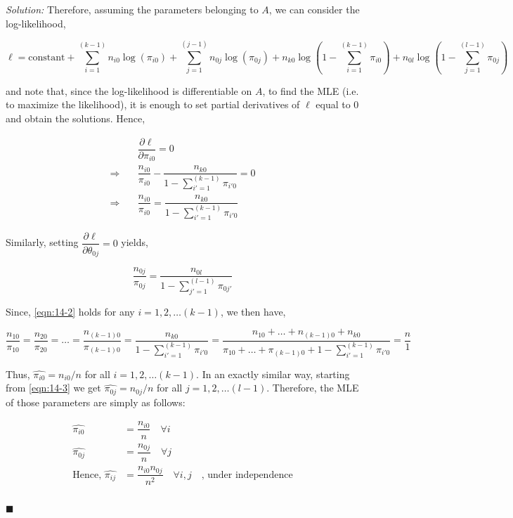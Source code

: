\documentclass[12pt]{article}
\theoremstyle{definition}
\newenvironment{answer}{\textit{Solution: }\quad }{ \hfill $\blacksquare$}
\numberwithin{equation}{section}
\begin{document}
\begin{answer}
    Therefore, assuming the parameters belonging to $A$, we can consider the log-likelihood,
    
    $$
    \ell = \text{constant} + \sum_{i=1}^{(k-1)} n_{i0} \log(\pi_{i0}) + \sum_{j=1}^{(j-1)} n_{0j} \log(\pi_{0j}) + n_{k0} \log\left(1 - \sum_{i=1}^{(k-1)}\pi_{i0}\right) + n_{0l} \log\left(1 - \sum_{j=1}^{(l-1)}\pi_{0j}\right)
    $$

    and note that, since the log-likelihood is differentiable on $A$, to find the MLE (i.e. to maximize the likelihood), it is enough to set partial derivatives of $\ell$ equal to $0$ and obtain the solutions.
    Hence,

    \begin{equation}
        \begin{split}
            & \dfrac{\partial \ell}{\partial \pi_{i0}} = 0\\
            \Rightarrow \quad & \dfrac{n_{i0}}{\pi_{i0}} - \dfrac{n_{k0}}{1 - \sum_{i'=1}^{(k-1)} \pi_{i'0}} = 0\\
            \Rightarrow \quad & \dfrac{n_{i0}}{\pi_{i0}} = \dfrac{n_{k0}}{1 - \sum_{i'=1}^{(k-1)} \pi_{i'0}}
        \end{split}
        \label{eqn:14-2}
    \end{equation}

    Similarly, setting $\dfrac{\partial \ell}{\partial \theta_{0j}} = 0$ yields,

    \begin{equation}
        \dfrac{n_{0j}}{\pi_{0j}} = \dfrac{n_{0l}}{1 - \sum_{j'=1}^{(l-1)} \pi_{0j'}}
        \label{eqn:14-3}
    \end{equation}

    Since, \cref{eqn:14-2} holds for any $i = 1, 2, \dots (k-1)$, we then have,

    $$
    \dfrac{n_{10}}{\pi_{10}} = \dfrac{n_{20}}{\pi_{20}} = \dots = \dfrac{n_{(k-1)0}}{\pi_{(k-1)0}} = \dfrac{n_{k0}}{1 - \sum_{i'=1}^{(k-1)} \pi_{i'0}} = \dfrac{n_{10} + \dots + n_{(k-1)0} + n_{k0}}{\pi_{10} + \dots + \pi_{(k-1)0} + 1 - \sum_{i'=1}^{(k-1)} \pi_{i'0}} = \dfrac{n}{1}
    $$

    Thus, $\widehat{\pi_{i0}} = n_{i0}/n$ for all $i = 1, 2, \dots (k-1)$. In an exactly similar way, starting from \cref{eqn:14-3} we get $\widehat{\pi_{0j}} = n_{0j}/n$ for all $j = 1, 2, \dots (l-1)$. Therefore, the MLE of those parameters are simply as follows:

    \begin{align*}
        \widehat{\pi_{i0}} & = \dfrac{n_{i0}}{n} \quad \forall i  \\
        \widehat{\pi_{0j}} & = \dfrac{n_{0j}}{n} \quad \forall j  \\
        \text{Hence, } \widehat{\pi_{ij}} & = \dfrac{n_{i0}n_{0j}}{n^2} \quad \forall i, j \quad \text{, under independence}\\    
    \end{align*}


\end{answer}
\end{document}
